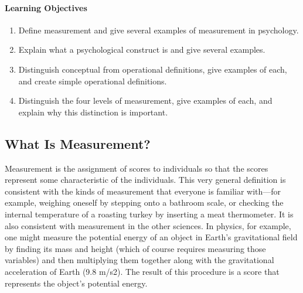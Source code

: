  \paragraph{Learning Objectives}
 \begin{enumerate}
 \item Define measurement and give several examples of measurement in psychology.

\item Explain what a psychological construct is and give several examples.

\item  Distinguish conceptual from operational definitions, give examples of each, and create simple operational definitions.

\item Distinguish the four levels of measurement, give examples of each, and explain why this distinction is important.
  \end{enumerate}



\subsection{What Is Measurement?}


Measurement is the assignment of scores to individuals so that the scores represent some characteristic of the individuals. This very general definition is consistent with the kinds of measurement that everyone is familiar with—for example, weighing oneself by stepping onto a bathroom scale, or checking the internal temperature of a roasting turkey by inserting a meat thermometer. It is also consistent with measurement in the other sciences. In physics, for example, one might measure the potential energy of an object in Earth's gravitational field by finding its mass and height (which of course requires measuring those variables) and then multiplying them together along with the gravitational acceleration of Earth (9.8 m/s2). The result of this procedure is a score that represents the object's potential energy.


